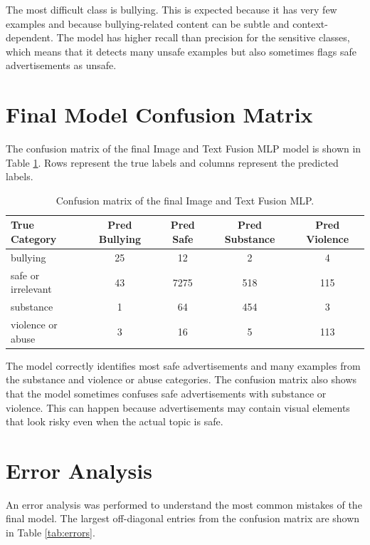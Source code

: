 \documentclass[12pt]{article}
\begin{document}
The most difficult class is bullying. This is expected because it has very few examples and because bullying-related content can be subtle and context-dependent. The model has higher recall than precision for the sensitive classes, which means that it detects many unsafe examples but also sometimes flags safe advertisements as unsafe.

\section{Final Model Confusion Matrix}

The confusion matrix of the final Image and Text Fusion MLP model is shown in Table \ref{tab:confusion}. Rows represent the true labels and columns represent the predicted labels.

\begin{table}[H]
\centering
\begin{tabular}{lcccc}
\toprule
\textbf{True Category} & \textbf{Pred Bullying} & \textbf{Pred Safe} & \textbf{Pred Substance} & \textbf{Pred Violence} \\
\midrule
bullying & 25 & 12 & 2 & 4 \\
safe or irrelevant & 43 & 7275 & 518 & 115 \\
substance & 1 & 64 & 454 & 3 \\
violence or abuse & 3 & 16 & 5 & 113 \\
\bottomrule
\end{tabular}
\caption{Confusion matrix of the final Image and Text Fusion MLP.}
\label{tab:confusion}
\end{table}

The model correctly identifies most safe advertisements and many examples from the substance and violence or abuse categories. The confusion matrix also shows that the model sometimes confuses safe advertisements with substance or violence. This can happen because advertisements may contain visual elements that look risky even when the actual topic is safe.

\section{Error Analysis}

An error analysis was performed to understand the most common mistakes of the final model. The largest off-diagonal entries from the confusion matrix are shown in Table \ref{tab:errors}.
\end{document}
